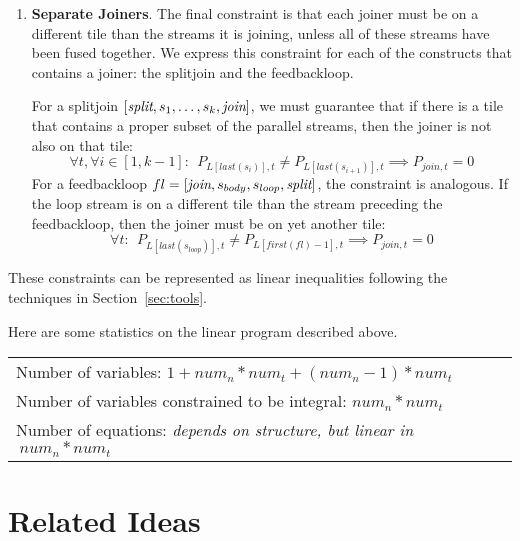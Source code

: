 \documentclass[12pt]{article}
\begin{document}
\begin{enumerate}
    \item {\bf Separate Joiners}.  The final constraint is that each
    joiner must be on a different tile than the streams it is joining,
    unless all of these streams have been fused together.  We express
    this constraint for each of the constructs that contains a joiner:
    the splitjoin and the feedbackloop.

    For a splitjoin $[\mbox{\it split}, s_1, \dots, s_k, \mbox{\it join}]$, we must
    guarantee that if there is a tile that contains a proper subset of
    the parallel streams, then the joiner is not also on that tile:
    \[
    \forall t, \forall i \in 
	    [1, k-1]:~~P_{L[last(s_i)],t} \ne P_{L[last(s_{i+1})],t}
	    \implies P_{join,t} = 0
    \]
    For a feedbackloop $fl = [\mbox{\it join}, s_{body}, s_{loop},
    \mbox{\it split}]$, the constraint is analogous.  If the loop stream is
    on a different tile than the stream preceding the feedbackloop,
    then the joiner must be on yet another tile:
    \[
    \forall t:~~P_{L[last(s_{loop})],t} \ne P_{L[first(fl)-1],t}
	    \implies P_{join,t} = 0
    \]

  \end{enumerate}

  These constraints can be represented as linear inequalities
  following the techniques in Section~\ref{sec:tools}.


  Here are some statistics on the linear program described above.

  \begin{tabular}{l} \\
    Number of variables: $1 + num_n * num_t + (num_n-1) * num_t$ \\
    Number of variables constrained to be integral: $num_n * num_t$ \\
    Number of equations: {\it depends on structure, but linear in}$~num_n * num_t$
  \end{tabular}

  \section{Related Ideas}
\end{document}
